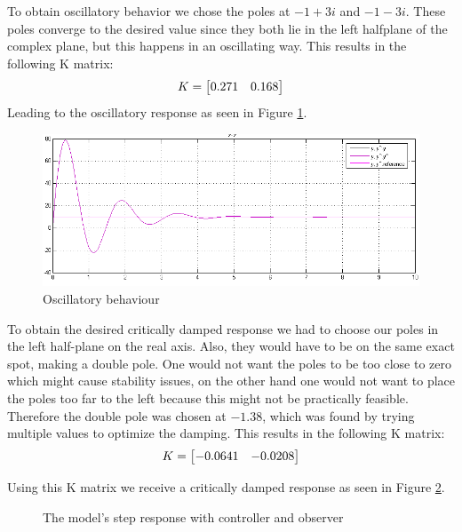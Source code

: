 \documentclass[final]{scrreprt} %
\begin{document}
To obtain oscillatory behavior we chose the poles at $-1 + 3i$ and $-1 - 3i$. These poles converge to the desired value since they both lie in the left halfplane of the complex plane, but this happens in an oscillating way. This results in the following K matrix:
\begin{equation}
\centering
K = 
\begin{bmatrix}
  0.271 & 0.168
\end{bmatrix}
\end{equation}
Leading to the oscillatory response as seen in Figure \ref{fig:oscillatory}.

\begin{figure}[h!]
\centering
\includegraphics[scale = 0.5]{res/osc-res.png}
\caption{Oscillatory behaviour}
\label{fig:oscillatory}
\end{figure}

To obtain the desired critically damped response we had to choose our poles in the left half-plane on the real axis. Also, they would have to be on the same exact spot, making a double pole. One would not want the poles to be too close to zero which might cause stability issues, on the other hand one would not want to place the poles too far to the left because this might not be practically feasible. Therefore the double pole was chosen at $-1.38$, which was found by trying multiple values to optimize the damping. This results in the following K matrix:
\begin{equation}
\centering
K =
\begin{bmatrix}
  -0.0641 & -0.0208
\end{bmatrix}
\end{equation}

Using this K matrix we receive a critically damped response as seen in Figure \ref{fig:crittically}.

\begin{figure}[H]
	\centering
    	\setlength\figureheight{4cm}
    	\setlength{}
    	    	
    	\caption{The model’s step response with controller and observer}
    	\label{fig:crittically}
\end{figure}
\end{document}
